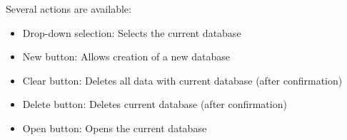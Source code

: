 Several actions are available:

\begin{itemize}  
\item Drop-down selection: Selects the current database
\item New button: Allows creation of a new database
\item Clear button: Deletes all data with current database (after confirmation)
\item Delete button: Deletes current database (after confirmation)
\item Open button: Opens the current database
\end{itemize} 
